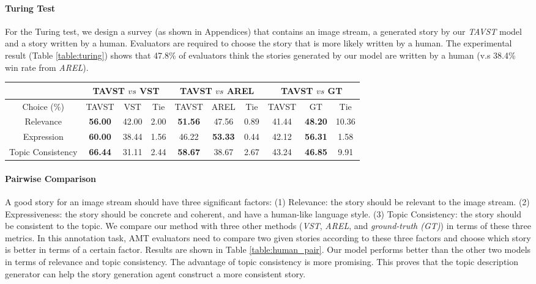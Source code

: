\documentclass[11pt]{article}
\begin{document}
\paragraph{Turing Test}
For the Turing test, we design a survey (as shown in Appendices) that contains an image stream, a generated story by our \emph{TAVST} model and a story written by a human. Evaluators are required to choose the story that is more likely written by a human. The experimental result (Table \ref{table:turing}) shows that 47.8\% of evaluators think the stories generated by our model are written by a human (v.s 38.4\% win rate from \emph{AREL}). 

\begin{table*}[!htp]


	\centering
	\small
\begin{tabular}{c|ccc|ccc|ccc}
		\hline
		& \multicolumn{3}{c|}{TAVST  $vs$ VST} & \multicolumn{3}{c|}{TAVST  $vs$ AREL}& \multicolumn{3}{c}{TAVST  $vs$ GT} \\
		\hline
		Choice (\%) & TAVST  & VST & Tie & TAVST  & AREL & Tie & TAVST  & GT & Tie \\
		\hline
		Relevance & \textbf{56.00} & 42.00 & 2.00 & \textbf{51.56} & 47.56 & 0.89 & 41.44 & \textbf{48.20} & 10.36 \\  
		Expression & \textbf{60.00} & 38.44 & 1.56 & 46.22 & \textbf{53.33} & 0.44 & 42.12 & \textbf{56.31} & 1.58 \\ 
		Topic Consistency & \textbf{66.44} & 31.11 & 2.44 & \textbf{58.67} & 38.67 & 2.67 & 43.24 & \textbf{46.85} & 9.91 \\ 
\hline
	\end{tabular}
	\vspace{-2mm}
\smallskip
	\caption{ Human evaluation results on pairwise comparison. }
	\label{table:human_pair}
	\vspace{-4mm}
\end{table*}




\paragraph{Pairwise Comparison}
A good story for an image stream should have three significant factors: (1) Relevance: the story should be relevant to the image stream. (2) Expressiveness: the story should be concrete and coherent, and have a human-like language style. (3) Topic Consistency: the story should be consistent to the topic. We compare our method with three other methods (\emph{VST}, \emph{AREL}, and \emph{ground-truth (GT)}) in terms of these three metrics.
In this annotation task, AMT evaluators need to compare two given stories according to these three factors and choose which story is better in terms of a certain factor. Results are shown in Table \ref{table:human_pair}. Our model performs better than the other two models in terms of relevance and topic consistency. The advantage of topic consistency is more promising. This proves that the topic description generator can help the story generation agent construct a more consistent story. 
\end{document}
